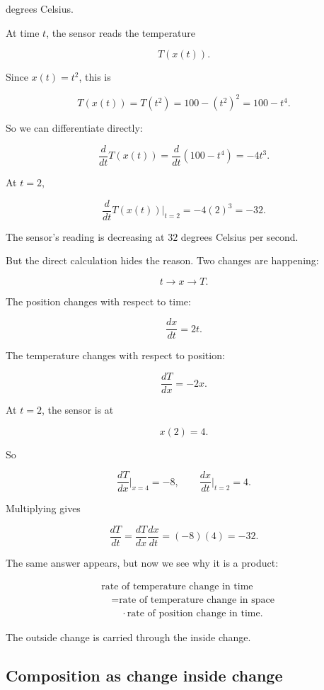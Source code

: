 degrees Celsius.

At time \(t\), the sensor reads the temperature

\[
T(x(t)).
\]

Since \(x(t)=t^2\), this is

\[
T(x(t))=T(t^2)=100-(t^2)^2=100-t^4.
\]

So we can differentiate directly:

\[
\frac{d}{dt}T(x(t))
=
\frac{d}{dt}(100-t^4)
=
-4t^3.
\]

At \(t=2\),

\[
\frac{d}{dt}T(x(t))\bigg|_{t=2}
=
-4(2)^3
=
-32.
\]

The sensor's reading is decreasing at \(32\) degrees Celsius per second.

But the direct calculation hides the reason.  Two changes are happening:

\[
t \longrightarrow x \longrightarrow T.
\]

The position changes with respect to time:

\[
\frac{dx}{dt}=2t.
\]

The temperature changes with respect to position:

\[
\frac{dT}{dx}=-2x.
\]

At \(t=2\), the sensor is at

\[
x(2)=4.
\]

So

\[
\frac{dT}{dx}\bigg|_{x=4}=-8,
\qquad
\frac{dx}{dt}\bigg|_{t=2}=4.
\]

Multiplying gives

\[
\frac{dT}{dt}
=
\frac{dT}{dx}\frac{dx}{dt}
=
(-8)(4)
=
-32.
\]

The same answer appears, but now we see why it is a product:

\[
\boxed{
\begin{aligned}
&\text{rate of temperature change in time} \\
&\quad = \text{rate of temperature change in space} \\
&\quad\quad \cdot \text{rate of position change in time}.
\end{aligned}
}
\]

The outside change is carried through the inside change.

\subsection{Composition as change inside change}
\label{subsec:composition-change-inside-change}

